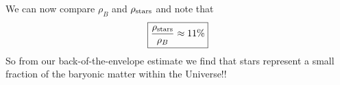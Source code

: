 \documentclass[12pt, letterpaper, twoside]{article}
\begin{document}
{    \noindent We can now compare $\rho_B$ and $\rho_{\rm stars}$ and note that
    \begin{equation}
        \boxed{ \frac{\rho_{\rm stars}}{\rho_B} \approx 11\% }
    \end{equation}
    So from our back-of-the-envelope estimate we find that stars represent a small fraction of the baryonic matter within the Universe!!
}
\end{document}
